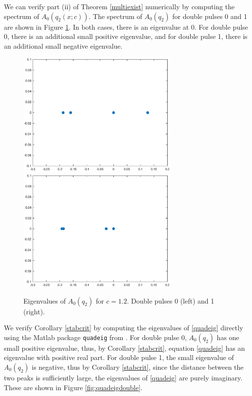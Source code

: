 \documentclass[12pt]{article}
\begin{document}
We can verify part (ii) of Theorem \ref{multiexist} numerically by computing the spectrum of $A_0(q_2(x; c))$. The spectrum of $A_0(q_2)$ for double pulses 0 and 1 are shown in Figure \ref{fig:specA0double}. In both cases, there is an eigenvalue at 0. For double pulse 0, there is an additional small positive eigenvalue, and for double pulse 1, there is an additional small negative eigenvalue.

\begin{figure}[H]
\centering
\includegraphics[width=8cm]{specA0d1}
\includegraphics[width=8cm]{specA0d2}
\caption{Eigenvalues of $A_0(q_2)$ for $c = 1.2$. Double pulses 0 (left) and 1 (right).}
\label{fig:specA0double}
\end{figure}

We verify Corollary \ref{stabcrit} by computing the eigenvalues of \eqref{quadeig} directly using the Matlab package \texttt{quadeig} from \cite{Hammarling2013}. For double pulse 0, $A_0(q_2)$ has one small positive eigenvalue, thus, by Corollary \ref{stabcrit}, equation \eqref{quadeig} has an eigenvalue with positive real part. For double pulse 1, the small eigenvalue of $A_0(q_2)$ is negative, thus by Corollary \ref{stabcrit}, since the distance between the two peaks is sufficiently large, the eigenvalues of \eqref{quadeig} are purely imaginary. These are shown in Figure \ref{fig:quadeigdouble}.
\end{document}
